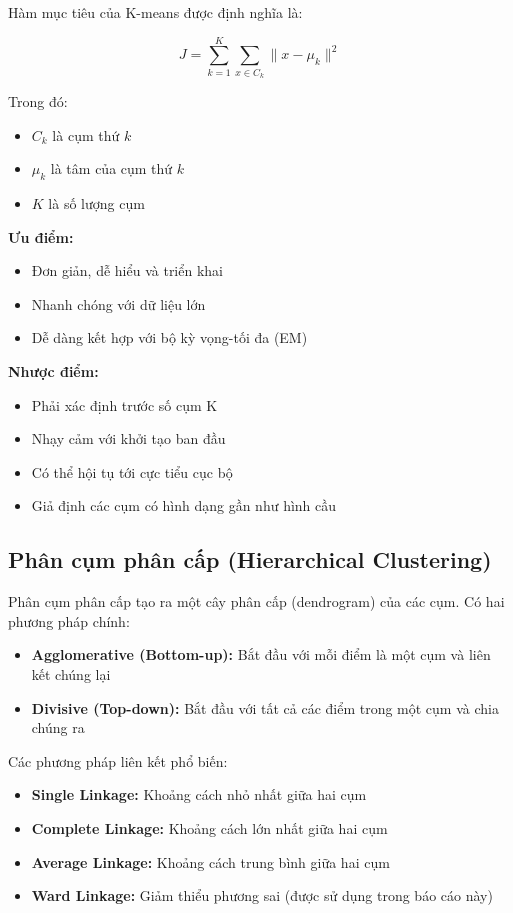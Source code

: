 Hàm mục tiêu của K-means được định nghĩa là:

\begin{equation}
J = \sum_{k=1}^{K} \sum_{x \in C_k} \|x - \mu_k\|^2
\end{equation}

Trong đó:
\begin{itemize}
    \item $C_k$ là cụm thứ $k$
    \item $\mu_k$ là tâm của cụm thứ $k$
    \item $K$ là số lượng cụm
\end{itemize}

\textbf{Ưu điểm:}
\begin{itemize}
    \item Đơn giản, dễ hiểu và triển khai
    \item Nhanh chóng với dữ liệu lớn
    \item Dễ dàng kết hợp với bộ kỳ vọng-tối đa (EM)
\end{itemize}

\textbf{Nhược điểm:}
\begin{itemize}
    \item Phải xác định trước số cụm K
    \item Nhạy cảm với khởi tạo ban đầu
    \item Có thể hội tụ tới cực tiểu cục bộ
    \item Giả định các cụm có hình dạng gần như hình cầu
\end{itemize}

\subsection{Phân cụm phân cấp (Hierarchical Clustering)}

Phân cụm phân cấp tạo ra một cây phân cấp (dendrogram) của các cụm. Có hai phương pháp chính:

\begin{itemize}
    \item \textbf{Agglomerative (Bottom-up):} Bắt đầu với mỗi điểm là một cụm và liên kết chúng lại
    \item \textbf{Divisive (Top-down):} Bắt đầu với tất cả các điểm trong một cụm và chia chúng ra
\end{itemize}

Các phương pháp liên kết phổ biến:
\begin{itemize}
    \item \textbf{Single Linkage:} Khoảng cách nhỏ nhất giữa hai cụm
    \item \textbf{Complete Linkage:} Khoảng cách lớn nhất giữa hai cụm
    \item \textbf{Average Linkage:} Khoảng cách trung bình giữa hai cụm
    \item \textbf{Ward Linkage:} Giảm thiểu phương sai \cite{hierarchical_clustering} (được sử dụng trong báo cáo này)
\end{itemize}


